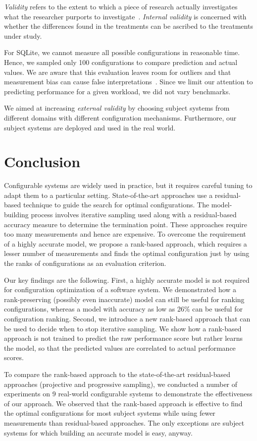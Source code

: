 {\em Validity} refers to the extent to which a piece of research actually
investigates what the researcher purports to investigate~\cite{SSA15}.
{\em Internal validity} is concerned with whether the differences found in
the treatments can be ascribed to the treatments under study. 

For SQLite, we cannot measure all possible configurations in reasonable time. Hence, we sampled only 100 configurations to compare prediction and actual values. We are aware that this evaluation leaves room for outliers and that measurement bias can cause false interpretations~\cite{me12d}. Since we limit our attention to predicting performance for a given workload, we did not vary benchmarks.



We aimed at increasing {\em external validity} by choosing subject systems from different domains with different configuration mechanisms. Furthermore, our subject systems  are deployed and used in the real world.

\section{Conclusion}
Configurable systems are widely used in practice, but it requires careful tuning to adapt them to a particular setting. State-of-the-art approaches use a residual-based technique to guide the search for optimal configurations. The model-building process involves iterative sampling used along with a residual-based accuracy measure to determine the termination point. These approaches require too many measurements and hence are expensive. To overcome the requirement of a highly accurate model, we propose a rank-based approach, which requires a lesser number of measurements and finds the optimal configuration just by using the ranks of configurations as an evaluation criterion.

Our key findings are the following. First, a highly accurate model is not required for  configuration optimization of a software system. We demonstrated how a rank-preserving (possibly even inaccurate) model can still be useful for ranking configurations, whereas a model with accuracy as low as 26\% can be useful for configuration ranking. Second, we introduce a new rank-based approach that can be used to decide when to stop iterative sampling. We show how a rank-based approach is not trained to predict the raw performance score but rather learns the model, so that the predicted values are correlated to actual performance scores.

To compare the rank-based approach to the state-of-the-art residual-based approaches (projective and progressive sampling), we conducted  a number of experiments on 9 real-world configurable systems to demonstrate the effectiveness of our approach. We observed that the rank-based approach is effective to find the optimal configurations for most subject systems while using fewer measurements than residual-based approaches. The only exceptions are subject systems for which building an accurate model is easy, anyway.